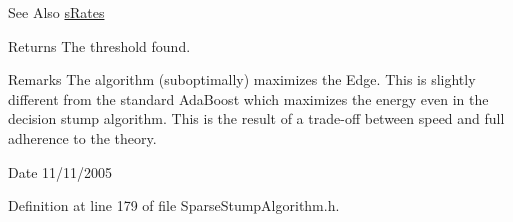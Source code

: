\begin{DoxySeeAlso}{See Also}
\hyperlink{structMultiBoost_1_1sRates}{s\-Rates} 
\end{DoxySeeAlso}
\begin{DoxyReturn}{Returns}
The threshold found. 
\end{DoxyReturn}
\begin{DoxyRemark}{Remarks}
The algorithm (suboptimally) maximizes the Edge. This is slightly different from the standard Ada\-Boost which maximizes the energy even in the decision stump algorithm. This is the result of a trade-\/off between speed and full adherence to the theory. 
\end{DoxyRemark}
\begin{DoxyDate}{Date}
11/11/2005 
\end{DoxyDate}


Definition at line 179 of file Sparse\-Stump\-Algorithm.\-h.

